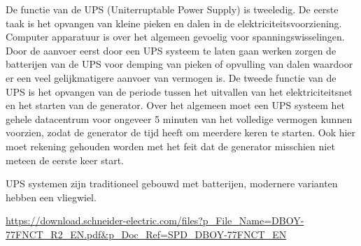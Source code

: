 De functie van de UPS (Uniterruptable Power Supply) is tweeledig. De eerste taak is het opvangen van kleine pieken en dalen in de elektriciteitsvoorziening. Computer apparatuur is over het algemeen gevoelig voor spanningswisselingen. Door de aanvoer eerst door een UPS systeem te laten gaan werken zorgen de batterijen van de UPS voor demping van pieken of opvulling van dalen waardoor er een veel gelijkmatigere aanvoer van vermogen is. De tweede functie van de UPS is het opvangen van de periode tussen het uitvallen van het elektriciteitsnet en het starten van de generator. Over het algemeen moet een UPS systeem het gehele datacentrum voor ongeveer 5 minuten van het volledige vermogen kunnen voorzien, zodat de generator de tijd heeft om meerdere keren te starten. Ook hier moet rekening gehouden worden met het feit dat de generator misschien niet meteen de eerste keer start.

UPS systemen zijn traditioneel gebouwd met batterijen, modernere varianten hebben een vliegwiel.

\url{https://download.schneider-electric.com/files?p_File_Name=DBOY-77FNCT_R2_EN.pdf&p_Doc_Ref=SPD_DBOY-77FNCT_EN}
